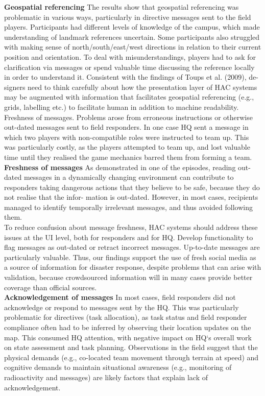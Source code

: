 \textbf{Geospatial referencing} The results show that geospatial referencing was problematic in various ways, particularly in directive messages sent to the field players. Participants had different levels of knowledge of the campus, which made understanding of landmark references uncertain. Some participants also struggled with making sense of north/south/east/west directions in relation to their current position and orientation. To deal with misunderstandings, players had to ask for clarification via messages or spend valuable time discussing the reference locally in order to understand it. Consistent with the findings of Toups et al. (2009), de- signers need to think carefully about how the presentation layer of HAC systems may be augmented with information that facilitates geospatial referencing (e.g., grids, labelling etc.) to facilitate human in addition to machine readability. Freshness of messages. Problems arose from erroneous instructions or otherwise out-dated messages sent to field responders. In one case HQ sent a message in which two players with non-compatible roles were instructed to team up. This was particularly costly, as the players attempted to team up, and lost valuable time until they realised the game mechanics barred them from forming a team.\\

\textbf{Freshness of messages} As demonstrated in one of the episodes, reading out-dated messages in a dynamically changing environment can contribute to responders taking dangerous actions that they believe to be safe, because they do not realise that the infor- mation is out-dated. However, in most cases, recipients managed to identify temporally irrelevant messages, and thus avoided following them.\\

To reduce confusion about message freshness, HAC systems should address these issues at the UI level, both for responders and for HQ. Develop functionality to flag messages as out-dated or retract incorrect messages. Up-to-date messages are particularly valuable. Thus, our findings support the use of fresh social media as a source of information for disaster response, despite problems that can arise with validation, because crowdsourced information will in many cases provide better coverage than official sources.\\

\textbf{Acknowledgement of messages} In most cases, field responders did not acknowledge or respond to messages sent by the HQ. This was particularly problematic for directives (task allocation), as task status and field responder compliance often had to be inferred by observing their location updates on the map. This consumed HQ attention, with negative impact on HQ`s overall work on state assessment and task planning. Observations in the field suggest that the physical demands (e.g., co-located team movement through terrain at speed) and cognitive demands to maintain situational awareness (e.g., monitoring of radioactivity and messages) are likely factors that explain lack of acknowledgement.\\

